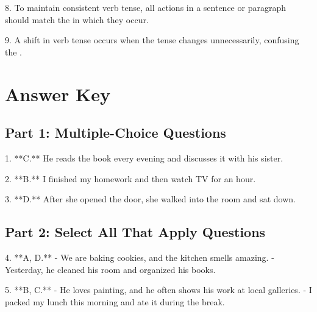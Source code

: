 \documentclass[12pt]{article}
\begin{document}
8. To maintain consistent verb tense, all actions in a sentence or paragraph should match the \underline{\hspace{4cm}} in which they occur.

\vspace{2cm}

9. A shift in verb tense occurs when the tense changes unnecessarily, confusing the \underline{\hspace{4cm}}.

\vspace{3cm}
\newpage
\section*{Answer Key}

\subsection*{Part 1: Multiple-Choice Questions}

1. **C.** He reads the book every evening and discusses it with his sister.

2. **B.** I finished my homework and then watch TV for an hour.

3. **D.** After she opened the door, she walked into the room and sat down.

\subsection*{Part 2: Select All That Apply Questions}

4. **A, D.**  
   - We are baking cookies, and the kitchen smells amazing.  
   - Yesterday, he cleaned his room and organized his books.

5. **B, C.**  
   - He loves painting, and he often shows his work at local galleries.  
   - I packed my lunch this morning and ate it during the break.






\end{document}
